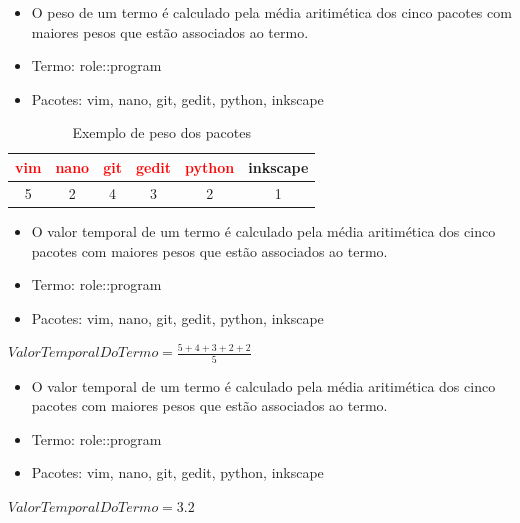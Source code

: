 \begin{frame}
    \begin{itemize}
        \item O peso de um termo é calculado pela média aritimética dos cinco
pacotes com maiores pesos que estão associados
ao termo.
        \item Termo: role::program
        \item Pacotes: vim, nano, git, gedit, python, inkscape
    \end{itemize}
    \begin{table}[h]
    \centering
    \begin{tabular}{cccccc}
    \hline
    \rowcolor[HTML]{EFEFEF}
    {\textcolor{red}{vim}} & {\textcolor{red}{nano}} & {\textcolor{red}{git}} & {\textcolor{red}{gedit}} & {\textcolor{red}{python}} & {inkscape} \\ \hline
    {5} & {2} & {4} & {3} & {2} & {1} \\ \hline
    \end{tabular}
    \caption{Exemplo de peso dos pacotes}
    \label{tab:classificacao_pacotes}
    \end{table}
\end{frame}

\begin{frame}
    \begin{itemize}
        \item O valor temporal de um termo é calculado pela média aritimética dos cinco
pacotes com maiores pesos que estão associados
ao termo.
        \item Termo: role::program
        \item Pacotes: vim, nano, git, gedit, python, inkscape
    \end{itemize}

    $ValorTemporalDoTermo = \frac{5 + 4 + 3 + 2 + 2}{5}$
\end{frame}

\begin{frame}
    \begin{itemize}
        \item O valor temporal de um termo é calculado pela média aritimética dos cinco
pacotes com maiores pesos que estão associados
ao termo.
        \item Termo: role::program
        \item Pacotes: vim, nano, git, gedit, python, inkscape
    \end{itemize}

    $ValorTemporalDoTermo = 3.2$
\end{frame}


